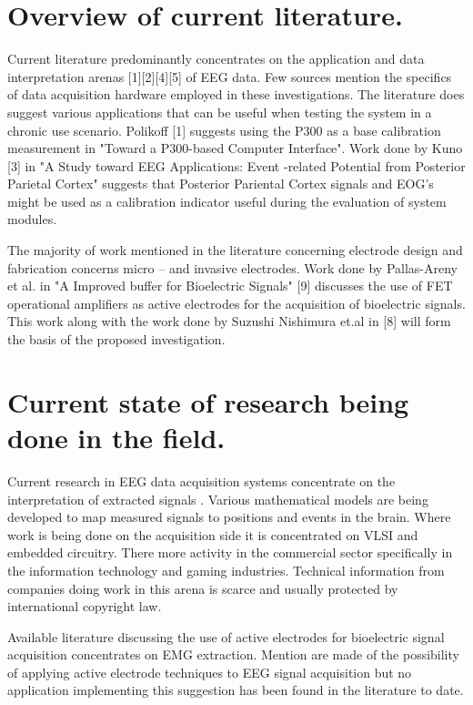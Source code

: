 \documentclass{article}
\begin{document}
\section{Overview of current literature.}
Current literature predominantly concentrates on the application and
data interpretation arenas [1][2][4][5] of EEG data. Few sources
mention the specifics of data acquisition hardware employed in these
investigations. The literature does suggest various applications that
can be useful when testing the system in a chronic use scenario.
Polikoff [1] suggests using the P300 as a base calibration measurement
in "Toward a P300-based Computer Interface". Work done by Kuno [3] in
"A Study toward EEG Applications: Event -related Potential from
Posterior Parietal Cortex" suggests that Posterior Pariental Cortex
signals and EOG's might be used as a calibration indicator useful
during the evaluation of system modules.

The majority of work mentioned in the literature concerning electrode
design and fabrication concerns micro -- and invasive electrodes.
Work done by Pallas-Areny et al. in "A Improved buffer for Bioelectric
Signals" [9] discusses the use of FET operational amplifiers as active
electrodes for the acquisition of bioelectric signals. This work along
with the work done by Suzushi Nishimura et.al in [8] will form the
basis of the proposed investigation.


\section{Current state of research being done in the field.}
Current research in EEG data acquisition systems concentrate on the
interpretation of extracted signals . Various mathematical models are
being developed to map measured signals to positions and events in the
brain. Where work is being done on the acquisition side it is
concentrated on VLSI and embedded circuitry. There more activity in
the commercial sector specifically in the information technology and
gaming industries. Technical information from companies doing work in
this arena is scarce and usually protected by international copyright
law.

Available literature discussing the use of active electrodes for
bioelectric signal acquisition concentrates on EMG extraction. Mention
are made of the possibility of applying active electrode techniques to
EEG signal acquisition but no application implementing this suggestion
has been found in the literature to date.
\end{document}
